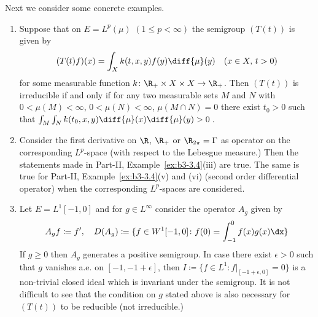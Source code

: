 Next we consider some concrete examples.

\begin{examples}\label{ex:c3-3.4}
	\begin{enumerate}[\upshape (i), wide, labelindent=.25em]
	\item 
	Suppose that on $E = L^{p}(\mu)$ $(1 \leq p < \infty)$ the semigroup $(T(t))$ is given by
	\begin{equation}\label{eq:c3-3.1}
		(T(t)f)(x) = \int_{X} k(t,x,y)f(y) \diff{\mu}(y) \quad (x \in X,\, t > 0)
	\end{equation}
	for some measurable function $k \colon \R _{+} \times X \times X \to \R _{+}$.
	Then $(T(t))$ is irreducible if and only if for any two measurable sets $M$ and $N$ with $0 < \mu(M) < \infty$, $0 < \mu(N) < \infty$, $\mu(M\cap N) = 0$ there exist $t_{0} > 0$ such that $\int_{M}\int_{N} k(t_{0},x,y)\diff{\mu}(x)\diff{\mu}(y) > 0$\,.
	
	\item 
	Consider the first derivative on $\R $, $\R _{+}$ or $\R _{2\pi} = \Gamma$ as operator on the corresponding $L^{p}$-space (with respect to the Lebesgue measure.)
	Then the statements made in Part-II, Example~\ref{ex:b3-3.4}(iii) are true.
	The same is true for Part-II, Example~\ref{ex:b3-3.4}(v) and (vi) (second order differential operator) when the corresponding $L^{p}$-spaces are considered.
	
	\item 
	Let $E = L^{1}[-1,0]$ and for $g \in L^{\infty}$ consider the operator $A_{g}$ given by
	\begin{equation}\label{eq:c3-3.2}
		A_{g}f \coloneqq f', \quad D(A_{g}) \coloneqq \{f \in W^{1}[-1,0] \colon f(0) = \int_{-1}^{0} f(x)g(x)\dx\}
	\end{equation}
	If\/ $g \geq 0$ then $A_{g}$ generates a positive semigroup.
	In case there exist $\epsilon > 0$ such that $g$ vanishes a.e. on $[-1,-1+\epsilon]$, then $I \coloneqq \{f \in L^{1} \colon f|_{[-1+\epsilon,0]} = 0\}$ is a non-trivial closed ideal which is invariant under the semigroup.
	It is not difficult to see that the condition on $g$ stated above is also necessary for $(T(t))$ to be reducible (\ie  not irreducible.)


\end{enumerate}
\end{examples}
